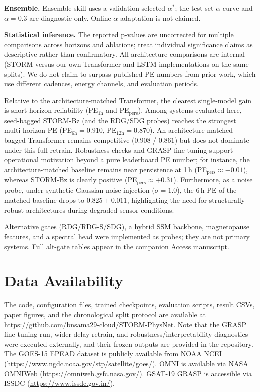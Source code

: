 \documentclass[conference]{IEEEtran}
\begin{document}
\textbf{Ensemble.} Ensemble skill uses a validation-selected \(\alpha^*\); the test-set \(\alpha\) curve and \(\alpha=0.3\) are diagnostic only. Online \(\alpha\) adaptation is not claimed.

\textbf{Statistical inference.} The reported p-values are uncorrected for multiple comparisons across horizons and ablations; treat individual significance claims as descriptive rather than confirmatory. All architecture comparisons are internal (STORM versus our own Transformer and LSTM implementations on the same splits). We do not claim to surpass published PE numbers from prior work, which use different cadences, energy channels, and evaluation periods.

Relative to the architecture-matched Transformer, the clearest single-model gain is short-horizon
reliability (PE$_{1\mathrm{h}}$ and PE$_{\mathrm{pers}}$).
Among systems evaluated here, seed-bagged STORM-Bz (and the RDG/SDG probes)
reaches the strongest multi-horizon PE
(PE$_{6\mathrm{h}}=0.910$, PE$_{12\mathrm{h}}=0.870$).
An architecture-matched bagged Transformer remains competitive
($0.908$ / $0.861$) but does not dominate under this full retrain.
Robustness checks and GRASP fine-tuning support operational motivation beyond a pure leaderboard PE number; for instance, the architecture-matched baseline remains near persistence at 1\,h (PE$_{\mathrm{pers}}\approx-0.01$), whereas STORM-Bz is clearly positive (PE$_{\mathrm{pers}}\approx+0.31$). Furthermore, as a noise probe, under synthetic Gaussian noise injection (\(\sigma=1.0\)), the 6\,h PE of the matched baseline drops to \(0.825 \pm 0.011\), highlighting the need for structurally robust architectures during degraded sensor conditions.

Alternative gates (RDG/RDG-S/SDG), a hybrid SSM backbone, magnetopause
features, and a spectral head were implemented as probes; they are not
primary systems. Full alt-gate tables appear in the companion Access manuscript.

\section*{Data Availability}
The code, configuration files, trained checkpoints, evaluation scripts,
result CSVs, paper figures, and the chronological split protocol are
available at
\url{https://github.com/bnsama29-cloud/STORM-PhysNet}. Note that the GRASP fine-tuning run, wider-delay retrain, and robustness/interpretability diagnostics were executed externally, and their frozen outputs are provided in the repository.
The GOES-15 EPEAD dataset is publicly available from NOAA NCEI
(\url{https://www.ngdc.noaa.gov/stp/satellite/goes/}).
OMNI is available via NASA OMNIWeb
(\url{https://omniweb.gsfc.nasa.gov/}).
GSAT-19 GRASP is accessible via ISSDC
(\url{https://www.issdc.gov.in/}). 
\end{document}
